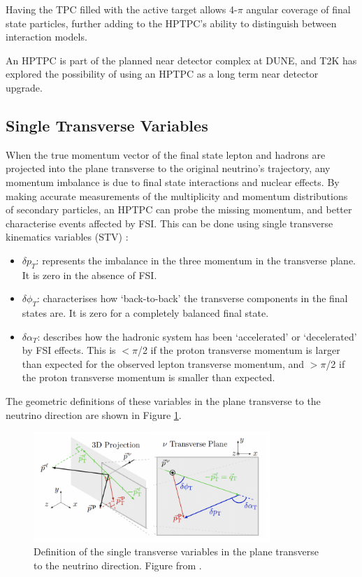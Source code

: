 Having the TPC filled with the active target allows 4-$\pi$ angular coverage of final state particles, further adding to the HPTPC's ability to distinguish between interaction models.

An HPTPC is part of the planned near detector complex at DUNE, and T2K has explored the possibility of using an HPTPC as a long term near detector upgrade. 

\subsection{Single Transverse Variables}

When the true momentum vector of the final state lepton and hadrons are projected into the plane transverse to the original neutrino’s trajectory, any momentum imbalance is due to final state interactions and nuclear effects. By making accurate measurements of the multiplicity and momentum distributions of secondary particles, an HPTPC can probe the missing momentum, and better characterise events affected by FSI. This can be done using single transverse kinematics variables (STV) \cite{stv1}:

\begin{itemize}

\item $\delta p_{T}$: represents the imbalance in the three momentum in the transverse plane. It is zero in the absence of FSI.

\item $\delta \phi_{T}$: characterises how `back-to-back' the transverse components in the final states are. It is zero for a completely balanced final state.

\item $\delta \alpha_{T}$: describes how the hadronic system has been `accelerated' or `decelerated' by FSI effects. This is $<\pi$/2 if the proton transverse momentum is larger than expected for the observed lepton transverse momentum, and $>\pi$/2 if the proton transverse momentum is smaller than expected.

\end{itemize}

The geometric definitions of these variables in the plane transverse to the neutrino direction are shown in Figure \ref{fig:stvdef}.

\begin{figure}
\centering
\includegraphics*[width=0.8\textwidth,clip]{figs/HorizSTV}
\caption{Definition of the single transverse variables in the plane transverse to the neutrino direction. Figure from \cite{stv2}.}\label{fig:stvdef}
\end{figure}

